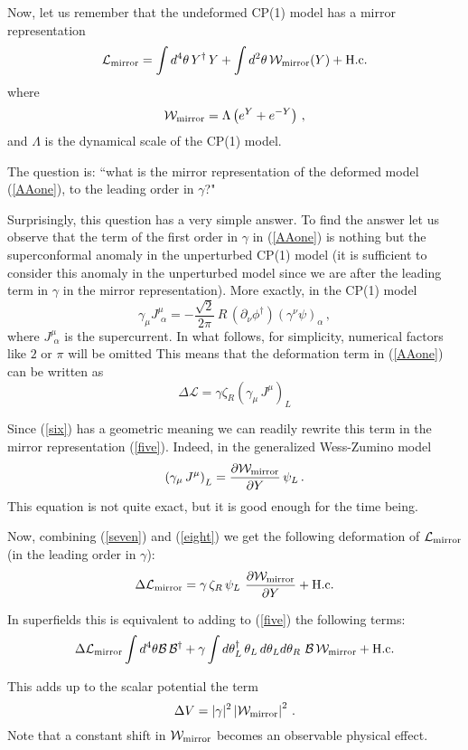 \documentclass[epsfig,12pt]{article}
\def\beq{\begin{equation}}
\def\eeq{\end{equation}}
\def\beq{\begin{equation}}
\def\eeq{\end{equation}}
\begin{document}
Now, let us remember that the undeformed CP(1) model has a mirror representation \cite{MR1,MR2}
\beq
{\mathcal L}_{\rm mirror} = \int d^4\theta\, Y^\dagger\, Y + \int d^2\theta\, {\mathcal W}_{\rm mirror}
(Y) + {\rm H.c.}
\label{five}
\eeq
where 
\beq
{\mathcal W}_{\rm mirror} = \Lambda \left( e^Y + e^{-Y}\right)\,,
\eeq
and $\Lambda$ is the dynamical scale of the CP(1) model.

The question is: ``what is the mirror representation of the deformed model (\ref{AAone}), to the leading order in $\gamma$?"

Surprisingly, this question has a very simple answer.
To find the answer let us observe that the term of the first order in $\gamma$ in (\ref{AAone})
is nothing but the superconformal anomaly in the unperturbed CP(1) model (it is sufficient to consider this anomaly in the unperturbed model since we are after the leading term in $\gamma$ in the mirror representation).
More exactly, in the CP(1) model
\beq
\gamma_\mu J^\mu_{\,\,\alpha} = -\frac{ \sqrt 2}{2\pi}\,R\, \left(\partial_\nu \phi^\dagger\right)\left(
\gamma^\nu\psi\right)_\alpha\,,
\label{six}
\eeq
where $J^\mu_{\,\,\alpha}$ is the supercurrent.
In what follows, for simplicity,  numerical factors like $2$ or $\pi$ will be omitted
This means that the deformation term in (\ref{AAone}) can be written as
\beq
\Delta {\mathcal L} = \gamma \zeta_R\left(\gamma_\mu \, J^\mu\right)_L
\label{seven}
\eeq 

Since (\ref{six}) has a geometric meaning we can readily rewrite this term in the mirror representation
(\ref{five}). Indeed, in the generalized Wess-Zumino model
\beq
\left(\gamma_\mu \, J^\mu\right)_L
 = \frac{\partial {\mathcal W}_{\rm mirror}}{\partial Y}\,\psi_L\,.
 \label{eight}
\eeq
This equation is not quite exact, but it is good enough for the time being.

Now, combining (\ref{seven}) and (\ref{eight})
we get the following deformation of ${\mathcal L}_{\rm mirror}$ (in the leading order in $\gamma$):
\beq
\Delta {\mathcal L}_{\rm mirror}= \gamma \, \zeta_R \,\psi_L\,\, \frac{\partial {\mathcal W}_{\rm mirror}}{\partial Y}
+{\rm H.c.}
\eeq

In superfields this is equivalent to adding to (\ref{five}) the following terms:
\beq
\Delta {\mathcal L}_{\rm mirror}  \int d^4\theta {\mathcal B}\, {\mathcal B}^\dagger 
+\gamma \int d\theta_L^\dagger\, \theta_L \,d\theta_L  d\theta_R\,\, {\mathcal B} \,{\mathcal W}_{\rm mirror}
+{\rm H.c.}
\eeq

This adds up to the scalar potential the term 
\beq
\Delta V = |\gamma|^2 \left|{\mathcal W}_{\rm mirror}\right|^2\,.
\eeq
Note that a constant shift in ${\mathcal W}_{\rm mirror}$
becomes an observable physical effect.
\end{document}
